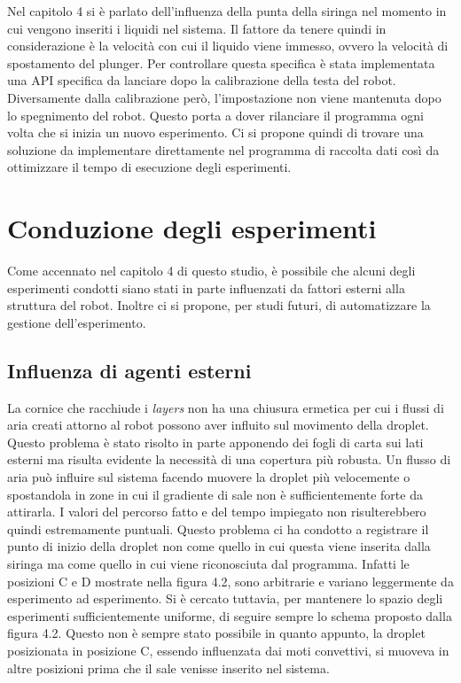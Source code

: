 Nel capitolo 4 si è parlato dell'influenza della punta della siringa nel momento in cui vengono inseriti i liquidi nel sistema. Il fattore da tenere quindi in considerazione è la velocità con cui il liquido viene immesso, ovvero la velocità di spostamento del plunger. Per controllare questa specifica è stata implementata una API specifica da lanciare dopo la calibrazione della testa del robot. Diversamente dalla calibrazione però, l'impostazione non viene mantenuta dopo lo spegnimento del robot. Questo porta a dover rilanciare il programma ogni volta che si inizia un nuovo esperimento. Ci si propone quindi di trovare una soluzione da implementare direttamente nel programma di raccolta dati così da ottimizzare il tempo di esecuzione degli esperimenti.  

\section{Conduzione degli esperimenti}
\label{sec:123}
Come accennato nel capitolo 4 di questo studio, è possibile che alcuni degli esperimenti condotti siano stati in parte influenzati da fattori esterni alla struttura del robot. Inoltre ci si propone, per studi futuri, di automatizzare la gestione dell'esperimento.
 
\subsection{Influenza di agenti esterni} 
La cornice che racchiude i \emph{layers} non ha una chiusura ermetica per cui i flussi di aria creati attorno al robot possono aver influito sul movimento della droplet. Questo problema è stato risolto in parte apponendo dei fogli di carta sui lati esterni ma risulta evidente la necessità di una copertura più robusta. Un flusso di aria può influire sul sistema facendo muovere la droplet più velocemente o spostandola in zone in cui il gradiente di sale non è sufficientemente forte da attirarla. I valori del percorso fatto e del tempo impiegato non risulterebbero quindi estremamente puntuali. 
Questo problema ci ha condotto a registrare il punto di inizio della droplet non come quello in cui questa viene inserita dalla siringa ma come quello in cui viene riconosciuta dal programma.  
Infatti le posizioni C e D mostrate nella figura 4.2, sono arbitrarie e variano leggermente da esperimento ad esperimento. Si è cercato tuttavia, per mantenere lo spazio degli esperimenti sufficientemente uniforme, di seguire sempre lo schema proposto dalla figura 4.2. Questo non è sempre stato possibile in quanto appunto, la droplet posizionata in posizione C, essendo influenzata dai moti convettivi, si muoveva in altre posizioni prima che il sale venisse inserito nel sistema. 

